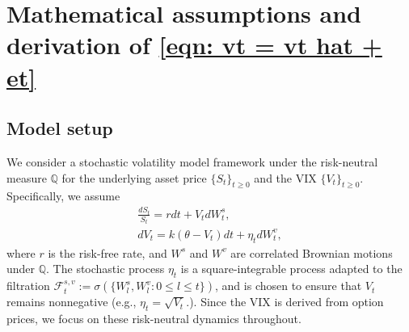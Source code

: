 
\section{Mathematical assumptions and derivation of \eqref{eqn: vt = vt hat + et}} \label{wide width and deep depth}

\subsection{Model setup}
We consider a stochastic volatility model framework under the risk-neutral measure $\mathbb{Q}$ for the underlying asset price $\{S_t\}_{t\geq 0}$ and the VIX $\{V_t\}_{t\geq 0}$. Specifically, we assume 
\begin{equation} \label{eqn: stoch vol model}
\begin{gathered}
\frac{dS_t}{S_t} = r dt + V_t dW^s_t, \\
dV_t = k \left( \theta - V_t \right) dt + \eta_t dW^v_t,
\end{gathered}
\end{equation}
where $r$ is the risk-free rate, and $W^s$ and $W^v$ are correlated Brownian motions under $\mathbb{Q}$. 
The stochastic process $\eta_t$ is a square-integrable process adapted to the filtration $\mathcal{F}^{s, v}_t := \sigma (\{W^s_l, W^v_l : 0 \leq l \leq t \})$, and is chosen to ensure that $V_t$ remains nonnegative (e.g., $\eta_t = \sqrt{V_t}.$). 
Since the VIX is derived from option prices, we focus on these risk-neutral dynamics throughout.


